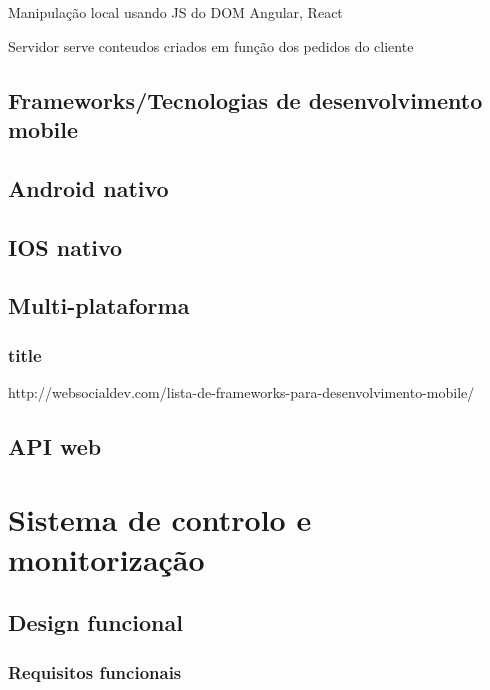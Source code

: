 Manipulação local usando JS do DOM
Angular, React

Servidor serve conteudos criados em função dos pedidos do cliente 





\section{Frameworks/Tecnologias de desenvolvimento mobile}



\section{Android nativo}

\section{IOS nativo}

\section{Multi-plataforma}

\subsection{title}


http://websocialdev.com/lista-de-frameworks-para-desenvolvimento-mobile/




\section{API web}


\chapter{Sistema de controlo e monitorização}


\section{Design funcional}











\subsection{Requisitos funcionais}

